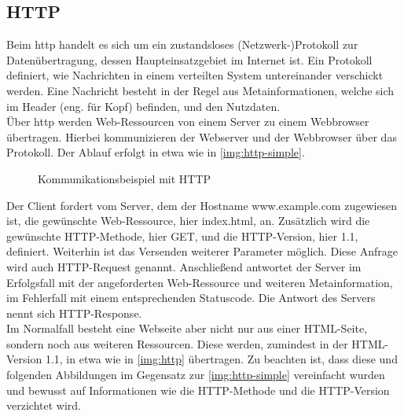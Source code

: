 \subsection{HTTP}
\label{sec:http}

Beim \ac{http} handelt es sich um ein zustandsloses (Netzwerk-)Protokoll zur Datenübertragung, dessen Haupteinsatzgebiet im Internet ist. Ein Protokoll definiert, wie Nachrichten in einem verteilten System untereinander verschickt werden. Eine Nachricht besteht in der Regel aus Metainformationen, welche sich im Header (eng. für Kopf) befinden, und den Nutzdaten.\\
Über \ac{http} werden Web-Ressourcen von einem Server zu einem Webbrowser übertragen. Hierbei kommunizieren der Webserver und der Webbrowser über das Protokoll. Der Ablauf erfolgt in etwa wie in \autoref{img:http-simple}.

\begin{figure}[H]
	\begin{center}
		
		\caption{Kommunikationsbeispiel mit HTTP}
		\label{img:http-simple}
	\end{center}
\end{figure}

%	

Der Client fordert vom Server, dem der Hostname www.example.com zugewiesen ist, die gewünschte Web-Ressource, hier index.html, an. Zusätzlich wird die gewünschte HTTP-Methode, hier GET, und die HTTP-Version, hier 1.1, definiert. Weiterhin ist das Versenden weiterer Parameter möglich. Diese Anfrage wird auch HTTP-Request genannt. Anschließend antwortet der Server im Erfolgsfall mit der angeforderten Web-Ressource und weiteren Metainformation, im Fehlerfall mit einem entsprechenden Statuscode. Die Antwort des Servers nennt sich HTTP-Response.\\
Im Normalfall besteht eine Webseite aber nicht nur aus einer HTML-Seite, sondern noch aus weiteren Ressourcen. Diese werden, zumindest in der HTML-Version 1.1, in etwa wie in \autoref{img:http} übertragen. Zu beachten ist, dass diese und folgenden Abbildungen im Gegensatz zur \autoref{img:http-simple} vereinfacht wurden und bewusst auf Informationen wie die HTTP-Methode und die HTTP-Version verzichtet wird.

